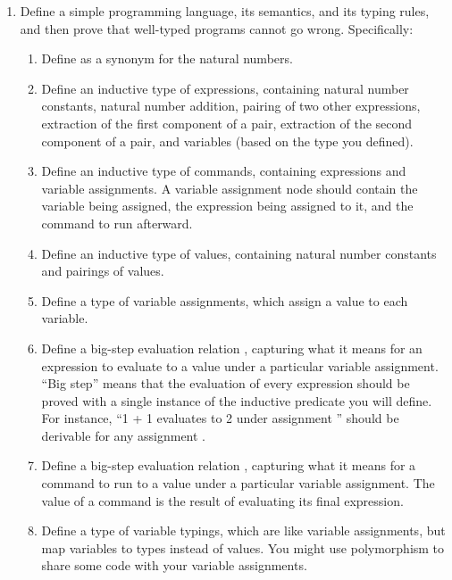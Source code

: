 \documentclass[12pt]{report}
\begin{document}
\begin{enumerate}
\begin{coqdoccode}
\coqdocindent{2.00em}
\{   ;  ; . \}\coqdoceol
\coqdocindent{2.00em}
  ;  ; . .\coqdoceol
\coqdocnoindent
{} .\coqdoceol
\coqdocemptyline
\end{coqdoccode}
\item Define a simple programming language, its semantics, and its typing rules, and then prove that well-typed programs cannot go wrong.  Specifically:
  \begin{enumerate}
    \item Define  as a synonym for the natural numbers.
    \item Define an inductive type  of expressions, containing natural number constants, natural number addition, pairing of two other expressions, extraction of the first component of a pair, extraction of the second component of a pair, and variables (based on the  type you defined).
    \item Define an inductive type  of commands, containing expressions and variable assignments.  A variable assignment node should contain the variable being assigned, the expression being assigned to it, and the command to run afterward.
    \item Define an inductive type  of values, containing natural number constants and pairings of values.
    \item Define a type of variable assignments, which assign a value to each variable.
    \item Define a big-step evaluation relation , capturing what it means for an expression to evaluate to a value under a particular variable assignment.  ``Big step'' means that the evaluation of every expression should be proved with a single instance of the inductive predicate you will define.  For instance, ``1 + 1 evaluates to 2 under assignment '' should be derivable for any assignment .
    \item Define a big-step evaluation relation , capturing what it means for a command to run to a value under a particular variable assignment.  The value of a command is the result of evaluating its final expression.
    \item Define a type of variable typings, which are like variable assignments, but map variables to types instead of values.  You might use polymorphism to share some code with your variable assignments.

\end{enumerate}
\end{enumerate}
\end{document}

